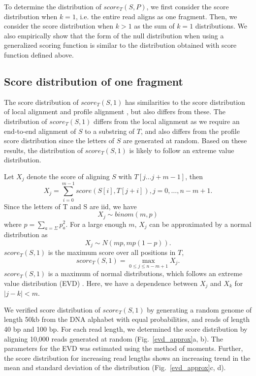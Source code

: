 To determine the distribution of $score_T(S, P)$, we first consider the score
distribution when $k = 1$, i.e. the entire read aligns as one fragment.
Then, we consider the score distribution when $k > 1$ as the sum of $k =
1$ distributions. We also empirically show that the form of the null
distribution when using a generalized scoring function is similar to the
distribution obtained with score function defined above.


\subsection{Score distribution of one fragment}
The score distribution of $score_T(S,1)$ has similarities to the score
distribution of local alignment \citep{} and profile alignment \citep{},
but also differs from these.  The distribution of $score_T(S,1)$ differs
from the local alignment as we require an end-to-end alignment of $S$ to
a substring of $T$, and also differs from the profile score distribution
since the letters of $S$ are generated at random.
Based on these results, the distribution of $score_T(S,1)$ is likely to
follow an extreme value distribution.

Let $X_j$ denote the score of aligning $S$ with $T[j \dots j+m-1]$, then
\[X_j = \sum_{i=0}^{m-1} score(S[i],T[j+i]), j = 0, \dots, n-m+1.\]
Since the letters of T and S are iid, we have \[X_j \sim binom(m,p)\]
where $p = \sum_{a=\Sigma} p_a^2$.  For a large enough $m$, $X_j$ can
be approximated by a normal distribution as \[X_j \sim N(mp, mp(1-p)).
\] $score_T(S,1)$ is the maximum score over all positions in $T$,
\[score_T(S,1) = \max_{0 \leq j \leq n-m+1} X_j.\] $score_T(S,1)$ is a
maximum of normal distributions, which follows an extreme value
distribution (EVD) \citep{kotz2000extreme}.
Here, we have a dependence between $X_j$ and $X_k$ for $|j - k| < m$.

We verified score distribution of $score_T(S,1)$ by generating a random
genome of length 50kb from the DNA alphabet with equal probabilities,
and reads of length 40 bp and 100 bp. For each read length, we
determined the score distribution by aligning 10,000 reads generated at
random (Fig.~\ref{evd_approx}a, b). The parameters for the EVD was
estimated using the method of moments.
Further, the score distribution for increasing read lengths shows an
increasing trend in the mean and standard deviation of the distribution
(Fig.~\ref{evd_approx}c, d).

